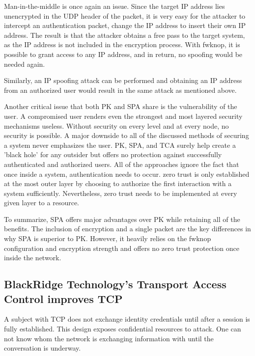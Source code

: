 Man-in-the-middle is once again an issue. Since the target IP address lies unencrypted in the UDP header of the packet, it is very easy for the attacker to intercept an authentication packet, change the IP address to insert their own IP address. The result is that the attacker obtains a free pass to the target system, as the IP address is not included in the encryption process. With fwknop, it is possible to grant access to any IP address, and in return, no spoofing would be needed again.  \par
Similarly, an IP spoofing attack can be performed and obtaining an IP address from an authorized user would result in the same attack as mentioned above.\\\par

Another critical issue that both PK and SPA share is the vulnerability of the user. A compromised user renders even the strongest and most layered security mechanisms useless. Without security on every level and at every node, no security is possible. A major downside to all of the discussed methods of securing a system never emphasizes the user. PK, SPA, and TCA surely help create a 'black hole' for any outsider but offers no protection against successfully authenticated and authorized users. All of the approaches ignore the fact that once inside a system, authentication needs to occur. zero trust is only established at the most outer layer by choosing to authorize the first interaction with a system sufficiently. Nevertheless, zero trust needs to be implemented at every given layer to a resource.\\\par

To summarize, SPA offers major advantages over PK while retaining all of the benefits. The inclusion of encryption and a single packet are the key differences in why SPA is superior to PK. However, it heavily relies on the fwknop configuration and encryption strength and offers no zero trust protection once inside the network.\par



\subsection{BlackRidge Technology's Transport Access Control improves TCP}

A subject with TCP does not exchange identity credentials until after a session is fully established.  This design exposes confidential resources to attack.  One can not know whom the network is exchanging information with until the conversation is underway.\par 

